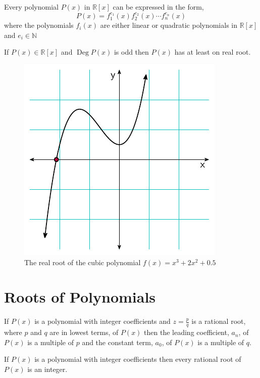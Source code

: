 \documentclass[11pt,numbers=noenddot,svgnames,dvipsnames]{scrartcl}
\DeclareMathOperator{\Deg}{Deg}
\begin{document}
\begin{corollary}
    Every polynomial $P(x)$ in $\mathbb{R}[x]$ can be expressed in the form,
    \[
        P(x) = f_{1}^{e_{1}}(x) f_{2}^{e_{2}}(x) \cdots f_{n}^{e_{n}}(x)
    \]
    where the polynomials $f_{i}(x)$ are either linear or quadratic polynomials in $\mathbb{R}[x]$ 
    and $e_{i} \in \mathbb{N}$
\end{corollary}

\begin{corollary}
    If $P(x) \in \mathbb{R}[x]$ and $\Deg P(x)$ is odd then $P(x)$ has at least on real root.
\end{corollary}

\begin{figure}[!htpb]
\centering
\includegraphics[scale=1]{figures/cubic_with_one_real_root}
\caption{The real root of the cubic polynomial $f(x)=x^3+2x^2+0.5$}
\end{figure}

\section{Roots of Polynomials}
\begin{theorem}
    If $P(x)$ is a polynomial with integer coefficients and $z=\frac{p}{q}$ is a 
    rational root, where $p$ and $q$ are in lowest terms, of $P(x)$ then 
    the leading coefficient, $a_{n}$, of $P(x)$ is a multiple of $p$ and the 
    constant term, $a_{0}$, of $P(x)$ is a multiple of $q$. 
\end{theorem}
\begin{corollary}
    If $P(x)$ is a polynomial with integer coefficients then every rational 
    root of $P(x)$ is an integer.
\end{corollary}
\end{document}
